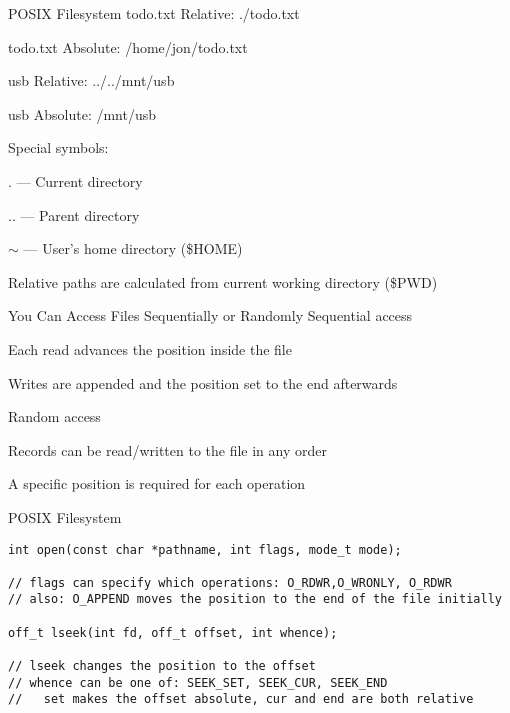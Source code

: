   \begin{frame}{POSIX Filesystem}
    todo.txt Relative: ./todo.txt

    todo.txt Absolute: /home/jon/todo.txt

    usb Relative: ../../mnt/usb

    usb Absolute: /mnt/usb

    \vspace{2em}

    Special symbols:

    \hspace{2em} . --- Current directory
    
    \hspace{2em} .. ---  Parent directory

    \hspace{2em} $\mathsf{\sim}$ --- User's home directory (\$HOME)

    Relative paths are calculated from current working directory (\$PWD)
  \end{frame}

  \begin{frame}{You Can Access Files Sequentially or Randomly}
    Sequential access

    \vspace{2em}

    \hspace{2em} Each read advances the position inside the file

    \hspace{2em} Writes are appended and the position set to the end afterwards

    \vspace{2em}

    Random access

    \hspace{2em} Records can be read/written to the file in any order

    \hspace{2em} A specific position is required for each operation
  \end{frame}

  \begin{frame}[fragile]{POSIX Filesystem}

    \begin{lstlisting}
int open(const char *pathname, int flags, mode_t mode);

// flags can specify which operations: O_RDWR,O_WRONLY, O_RDWR
// also: O_APPEND moves the position to the end of the file initially

off_t lseek(int fd, off_t offset, int whence);

// lseek changes the position to the offset
// whence can be one of: SEEK_SET, SEEK_CUR, SEEK_END
//   set makes the offset absolute, cur and end are both relative
    \end{lstlisting}
  \end{frame}

